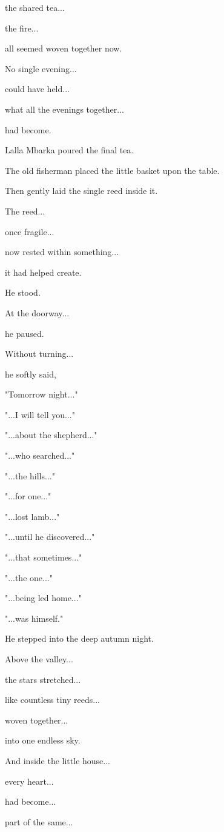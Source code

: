 \documentclass[12pt,openany]{book}
\begin{document}
the shared tea...

the fire...

all seemed woven together now.

No single evening...

could have held...

what all the evenings together...

had become.

Lalla Mbarka poured the final tea.

The old fisherman placed the little basket upon the table.

Then gently laid the single reed inside it.

The reed...

once fragile...

now rested within something...

it had helped create.

He stood.

At the doorway...

he paused.

Without turning...

he softly said,

"Tomorrow night..."

"...I will tell you..."

"...about the shepherd..."

"...who searched..."

"...the hills..."

"...for one..."

"...lost lamb..."

"...until he discovered..."

"...that sometimes..."

"...the one..."

"...being led home..."

"...was himself."

He stepped into the deep autumn night.

Above the valley...

the stars stretched...

like countless tiny reeds...

woven together...

into one endless sky.

And inside the little house...

every heart...

had become...

part of the same...
\end{document}
